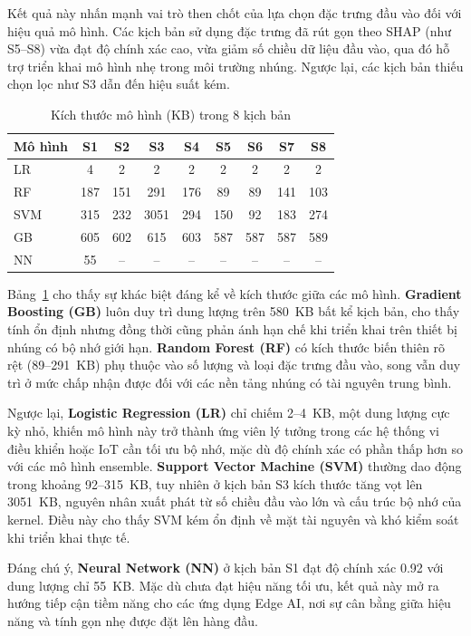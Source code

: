 Kết quả này nhấn mạnh vai trò then chốt của lựa chọn đặc trưng đầu vào đối với hiệu quả mô hình. Các kịch bản sử dụng đặc trưng đã rút gọn theo SHAP (như S5–S8) vừa đạt độ chính xác cao, vừa giảm số chiều dữ liệu đầu vào, qua đó hỗ trợ triển khai mô hình nhẹ trong môi trường nhúng. Ngược lại, các kịch bản thiếu chọn lọc như S3 dẫn đến hiệu suất kém.

\begin{table}[htbp]
\caption{Kích thước mô hình (KB) trong 8 kịch bản}
\label{tab:modelsize}
\centering
\renewcommand{\arraystretch}{1.1}
\scriptsize
\begin{tabular}{|l|c|c|c|c|c|c|c|c|}
\hline
\textbf{Mô hình} & S1 & S2 & S3 & S4 & S5 & S6 & S7 & S8 \\
\hline
LR  & 4   & 2   & 2    & 2   & 2   & 2   & 2   & 2   \\
RF  & 187 & 151 & 291  & 176 & 89  & 89  & 141 & 103 \\
SVM & 315 & 232 & 3051 & 294 & 150 & 92  & 183 & 274 \\
GB  & 605 & 602 & 615  & 603 & 587 & 587 & 587 & 589 \\
NN  & 55  & --  & --   & --  & --  & --  & --  & --   \\
\hline
\end{tabular}
\end{table}

Bảng~\ref{tab:modelsize} cho thấy sự khác biệt đáng kể về kích thước giữa các mô hình. 
\textbf{Gradient Boosting (GB)} luôn duy trì dung lượng trên 580~KB bất kể kịch bản, 
cho thấy tính ổn định nhưng đồng thời cũng phản ánh hạn chế khi triển khai trên thiết bị nhúng có bộ nhớ giới hạn. 
\textbf{Random Forest (RF)} có kích thước biến thiên rõ rệt (89–291~KB) phụ thuộc vào số lượng và loại đặc trưng đầu vào, 
song vẫn duy trì ở mức chấp nhận được đối với các nền tảng nhúng có tài nguyên trung bình.  

Ngược lại, \textbf{Logistic Regression (LR)} chỉ chiếm 2–4~KB, 
một dung lượng cực kỳ nhỏ, khiến mô hình này trở thành ứng viên lý tưởng trong các hệ thống vi điều khiển hoặc IoT cần tối ưu bộ nhớ, 
mặc dù độ chính xác có phần thấp hơn so với các mô hình ensemble. 
\textbf{Support Vector Machine (SVM)} thường dao động trong khoảng 92–315~KB, 
tuy nhiên ở kịch bản S3 kích thước tăng vọt lên 3051~KB, 
nguyên nhân xuất phát từ số chiều đầu vào lớn và cấu trúc bộ nhớ của kernel. 
Điều này cho thấy SVM kém ổn định về mặt tài nguyên và khó kiểm soát khi triển khai thực tế.  

Đáng chú ý, \textbf{Neural Network (NN)} ở kịch bản S1 đạt độ chính xác 0.92 với dung lượng chỉ 55~KB. 
Mặc dù chưa đạt hiệu năng tối ưu, kết quả này mở ra hướng tiếp cận tiềm năng cho các ứng dụng Edge AI, 
nơi sự cân bằng giữa hiệu năng và tính gọn nhẹ được đặt lên hàng đầu.  

